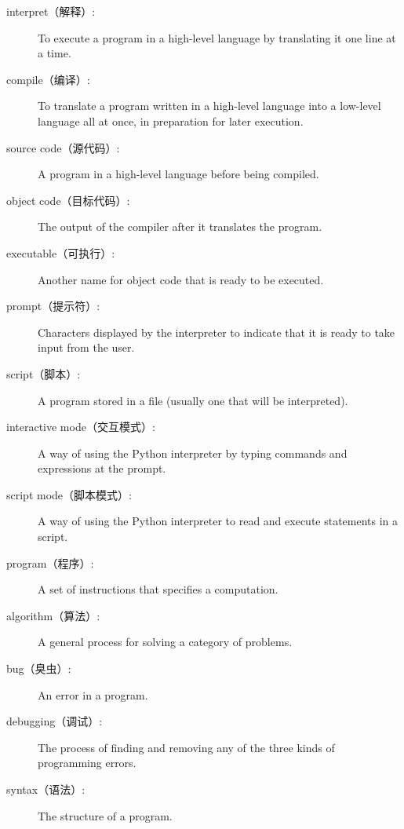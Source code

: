 \documentclass[10pt]{book}
\begin{document}
\begin{CJK}{UTF8}{gbsn}
\begin{description}
\item[interpret（解释）:]  To execute a program in a high-level language
by translating it one line at a time.

\item[compile（编译）:]  To translate a program written in a high-level language
into a low-level language all at once, in preparation for later
execution.

\item[source code（源代码）:]  A program in a high-level language before
being compiled.

\item[object code（目标代码）:]  The output of the compiler after it translates
the program.

\item[executable（可执行）:]  Another name for object code that is ready
to be executed.

\item[prompt（提示符）:] Characters displayed by the interpreter to indicate
that it is ready to take input from the user.

\item[script（脚本）:] A program stored in a file (usually one that will be
interpreted).

\item[interactive mode（交互模式）:] A way of using the Python interpreter by
typing commands and expressions at the prompt.

\item[script mode（脚本模式）:] A way of using the Python interpreter to read
and execute statements in a script.

\item[program（程序）:] A set of instructions that specifies a computation.

\item[algorithm（算法）:]  A general process for solving a category of
problems.

\item[bug（臭虫）:]  An error in a program.

\item[debugging（调试）:]  The process of finding and removing any of the
three kinds of programming errors.

\item[syntax（语法）:]  The structure of a program.


\end{description}
\end{CJK}
\end{document}
